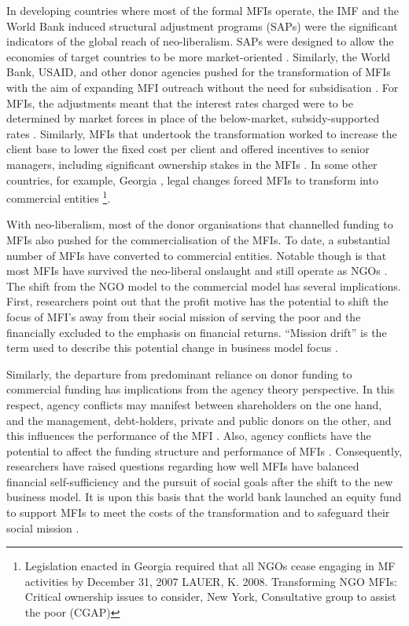 \documentclass[a4paper, nobind]{templates/ociamthesis}
\begin{document}
In developing countries where most of the formal MFIs operate, the IMF and the World Bank induced structural adjustment programs (SAPs) were the significant indicators of the global reach of neo-liberalism. SAPs were designed to allow the economies of target countries to be more market-oriented \autocite{easterly2003imf}. Similarly, the World Bank, USAID, and other donor agencies pushed for the transformation of MFIs with the aim of expanding MFI outreach without the need for subsidisation \autocite{ghosh2013microfinance}. For MFIs, the adjustments meant that the interest rates charged were to be determined by market forces in place of the below-market, subsidy-supported rates \autocite{bateman2010doesn}. Similarly, MFIs that undertook the transformation worked to increase the client base to lower the fixed cost per client and offered incentives to senior managers, including significant ownership stakes in the MFIs \autocite{lauer2008transforming}. In some other countries, for example, Georgia , legal changes forced MFIs to transform into commercial entities \footnote{Legislation enacted in Georgia required that all NGOs cease engaging in MF activities by December 31, 2007 LAUER, K. 2008. Transforming NGO MFIs: Critical ownership issues to consider, New York, Consultative group to assist the poor (CGAP)}.

With neo-liberalism, most of the donor organisations that channelled funding to MFIs also pushed for the commercialisation of the MFIs. To date, a substantial number of MFIs have converted to commercial entities. Notable though is that most MFIs have survived the neo-liberal onslaught and still operate as NGOs \autocite{d2017ngos}. The shift from the NGO model to the commercial model has several implications. First, researchers point out that the profit motive has the potential to shift the focus of MFI's away from their social mission of serving the poor and the financially excluded to the emphasis on financial returns. ``Mission drift'' is the term used to describe this potential change in business model focus \autocite{mersland2010microfinance}.

Similarly, the departure from predominant reliance on donor funding to commercial funding has implications from the agency theory perspective. In this respect, agency conflicts may manifest between shareholders on the one hand, and the management, debt-holders, private and public donors on the other, and this influences the performance of the MFI \autocite{fama1980agency}. Also, agency conflicts have the potential to affect the funding structure and performance of MFIs \autocite{berger2006capital,le2017capital}. Consequently, researchers have raised questions regarding how well MFIs have balanced financial self-sufficiency and the pursuit of social goals after the shift to the new business model. It is upon this basis that the world bank launched an equity fund to support MFIs to meet the costs of the transformation and to safeguard their social mission \autocite{frank2008stemming}.
\end{document}
